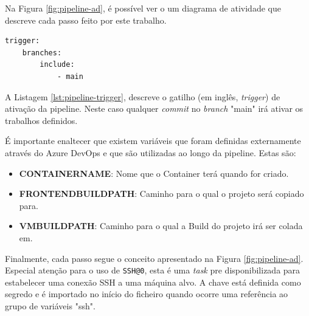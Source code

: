 Na Figura \ref{fig:pipeline-ad}, é possível ver o um diagrama de atividade que descreve cada passo feito por este trabalho.

\begin{lstlisting}[caption={Trigger - Pipeline},label={lst:pipeline-trigger}]
trigger:
    branches:
        include:
            - main
\end{lstlisting}


A Listagem \ref{lst:pipeline-trigger}, descreve o gatilho (em inglês, \textit{trigger}) de ativação da pipeline. Neste caso qualquer \textit{commit} no \textit{branch} "main" irá ativar os trabalhos definidos.

É importante enaltecer que existem variáveis que foram definidas externamente através do Azure DevOps e que são utilizadas ao longo da pipeline. Estas são:

\begin{itemize}
    \item \textbf{CONTAINERNAME}: Nome que o \gls{Container} terá quando for criado.
    \item \textbf{FRONTENDBUILDPATH}: Caminho para o qual o projeto será copiado para.
    \item \textbf{VMBUILDPATH}: Caminho para o qual a \gls{Build} do projeto irá ser colada em.
\end{itemize}

Finalmente, cada passo segue o conceito apresentado na Figura \ref{fig:pipeline-ad}. Especial atenção para o uso de \lstinline|SSH@0|\cite{docs-SSH0}, esta é uma \textit{task} pre disponibilizada para estabelecer uma conexão SSH a uma máquina alvo. A chave está definida como segredo e é importado no início do ficheiro quando ocorre uma referência ao grupo de variáveis "ssh".

